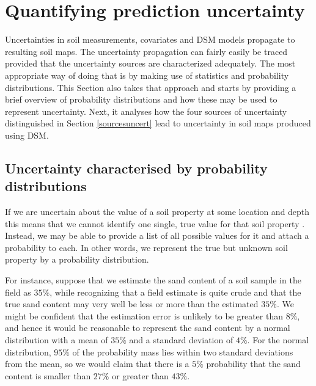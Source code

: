 \documentclass[10pt,b5paper,]{book}
\theoremstyle{definition}
\theoremstyle{definition}
\theoremstyle{definition}
\theoremstyle{remark}
\begin{document}
\hypertarget{quantifying-prediction-uncertainty}{%
\section{Quantifying prediction
uncertainty}\label{quantifying-prediction-uncertainty}}

Uncertainties in soil measurements, covariates and DSM models propagate
to resulting soil maps. The uncertainty propagation can fairly easily be
traced provided that the uncertainty sources are characterized
adequately. The most appropriate way of doing that is by making use of
statistics and probability distributions. This Section also takes that
approach and starts by providing a brief overview of probability
distributions and how these may be used to represent uncertainty. Next,
it analyses how the four sources of uncertainty distinguished in Section
\ref{sourcesuncert} lead to uncertainty in soil maps produced using DSM.

\hypertarget{uncertainty-characterised-by-probability-distributions}{%
\subsection{Uncertainty characterised by probability
distributions}\label{uncertainty-characterised-by-probability-distributions}}

If we are uncertain about the value of a soil property at some location
and depth this means that we cannot identify one single, true value for
that soil property
\citep{goovaerts2001geostatistical, arrouays_uncertainty_2014}. Instead,
we may be able to provide a list of all possible values for it and
attach a probability to each. In other words, we represent the true but
unknown soil property by a probability distribution.

For instance, suppose that we estimate the sand content of a soil sample
in the field as \(35\%\), while recognizing that a field estimate is
quite crude and that the true sand content may very well be less or more
than the estimated \(35\%\). We might be confident that the estimation
error is unlikely to be greater than \(8\%\), and hence it would be
reasonable to represent the sand content by a normal distribution with a
mean of \(35\%\) and a standard deviation of \(4\%\). For the normal
distribution, \(95\%\) of the probability mass lies within two standard
deviations from the mean, so we would claim that there is a \(5\%\)
probability that the sand content is smaller than \(27\%\) or greater
than \(43\%\).
\end{document}

